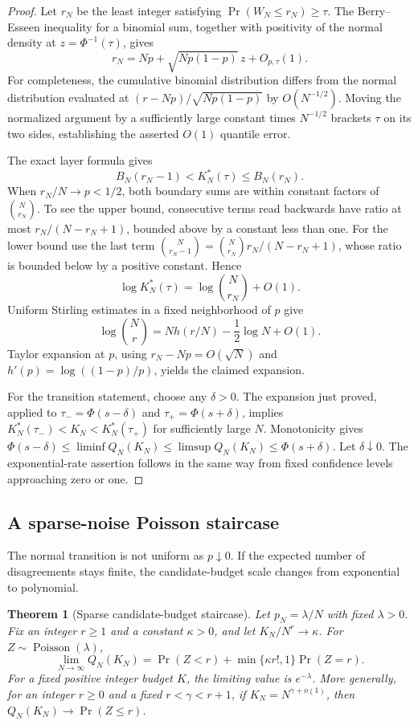 \documentclass[11pt]{article}
\numberwithin{equation}{section}
\newtheorem{theorem}{Theorem}[section]
\theoremstyle{definition}
\theoremstyle{remark}
\begin{document}
\begin{proof}
Let $r_N$ be the least integer satisfying
$\Pr(W_N\le r_N)\ge\tau$.  The Berry--Esseen inequality for a binomial
sum, together with positivity of the normal density at
$z=\Phi^{-1}(\tau)$, gives
\[
 r_N=Np+\sqrt{Np(1-p)}\,z+O_{p,\tau}(1).
\]
For completeness, the cumulative binomial distribution differs from the
normal distribution evaluated at $(r-Np)/\sqrt{Np(1-p)}$ by $O(N^{-1/2})$.
Moving the normalized argument by a sufficiently large constant times
$N^{-1/2}$ brackets $\tau$ on its two sides, establishing the asserted
$O(1)$ quantile error.

The exact layer formula gives
\[
 B_N(r_N-1)<K_N^*(\tau)\le B_N(r_N).
\]
When $r_N/N\to p<1/2$, both boundary sums are within constant factors of
$\binom N{r_N}$.  To see the upper bound, consecutive terms read backwards
have ratio at most $r_N/(N-r_N+1)$, bounded above by a constant less than
one.  For the lower bound use the last term
$\binom N{r_N-1}=\binom N{r_N}r_N/(N-r_N+1)$, whose ratio is bounded below
by a positive constant.  Hence
\[
 \log K_N^*(\tau)=\log\binom N{r_N}+O(1).
\]
Uniform Stirling estimates in a fixed neighborhood of $p$ give
\[
 \log\binom Nr=Nh(r/N)-\frac12\log N+O(1).
\]
Taylor expansion at $p$, using $r_N-Np=O(\sqrt N)$ and
$h'(p)=\log((1-p)/p)$, yields the claimed expansion.

For the transition statement, choose any $\delta>0$.  The expansion just
proved, applied to $\tau_-=\Phi(s-\delta)$ and
$\tau_+=\Phi(s+\delta)$, implies
$K_N^*(\tau_-)<K_N<K_N^*(\tau_+)$ for sufficiently large $N$.
Monotonicity gives $\Phi(s-\delta)\le\liminf Q_N(K_N)
\le\limsup Q_N(K_N)\le\Phi(s+\delta)$.  Let $\delta\downarrow0$.
The exponential-rate assertion follows in the same way from fixed
confidence levels approaching zero or one.
\end{proof}

\subsection{A sparse-noise Poisson staircase}

The normal transition is not uniform as $p\downarrow0$.  If the expected
number of disagreements stays finite, the candidate-budget scale changes
from exponential to polynomial.

\begin{theorem}[Sparse candidate-budget staircase]
\label{rbc:thm:budget-poisson}
Let $p_N=\lambda/N$ with fixed $\lambda>0$.  Fix an integer $r\ge1$ and
a constant $\kappa>0$, and let $K_N/N^r\to\kappa$.  For
$Z\sim\operatorname{Poisson}(\lambda)$,
\[
 \boxed{\lim_{N\to\infty}Q_N(K_N)
   =\Pr(Z<r)+\min\{\kappa r!,1\}\Pr(Z=r).}
\]
For a fixed positive integer budget $K$, the limiting value is
$e^{-\lambda}$.  More generally, for an integer $r\ge0$ and a fixed $r<\gamma<r+1$,
if $K_N=N^{\gamma+o(1)}$, then
$Q_N(K_N)\to\Pr(Z\le r)$.
\end{theorem}
\end{document}
